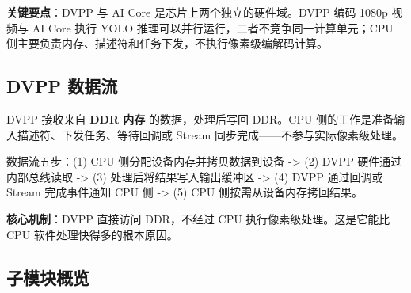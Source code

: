\textbf{关键要点}：DVPP 与 AI Core 是芯片上两个独立的硬件域。DVPP 编码
1080p 视频与 AI Core 执行 YOLO
推理可以并行运行，二者不竞争同一计算单元；CPU
侧主要负责内存、描述符和任务下发，不执行像素级编解码计算。

\subsection{DVPP 数据流}\label{src-book-chapter6-h2}

DVPP 接收来自 \textbf{DDR 内存} 的数据，处理后写回 DDR。CPU
侧的工作是准备输入描述符、下发任务、等待回调或 Stream
同步完成------不参与实际像素级处理。

数据流五步：(1) CPU 侧分配设备内存并拷贝数据到设备 -\textgreater{} (2)
DVPP 硬件通过内部总线读取 -\textgreater{} (3) 处理后将结果写入输出缓冲区
-\textgreater{} (4) DVPP 通过回调或 Stream 完成事件通知 CPU 侧
-\textgreater{} (5) CPU 侧按需从设备内存拷回结果。

\textbf{核心机制}：DVPP 直接访问 DDR，不经过 CPU
执行像素级处理。这是它能比 CPU 软件处理快得多的根本原因。

\subsection{子模块概览}\label{dvpp-modules}

